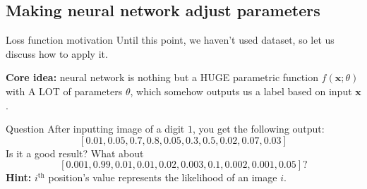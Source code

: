 \documentclass{beamer}
\begin{document}
    \subsection{Making neural network adjust parameters}
    \begin{frame}{Loss function motivation}
        Until this point, we haven't used dataset, so let us discuss how to apply it.
    
        \textbf{Core idea:} neural network is nothing but a HUGE parametric function $f(\mathbf{x};\theta)$ with A LOT of parameters $\theta$, which somehow outputs us a label based on input $\mathbf{x}$. 

        \begin{exampleblock}{Question}
        After inputting image of a digit $1$, you get the following output:
        \[
        [0.01, 0.05, 0.7, 0.8, 0.05, 0.3, 0.5, 0.02, 0.07, 0.03]
        \]
        Is it a good result? What about
        \[
        [0.001, 0.99, 0.01, 0.01, 0.02, 0.003, 0.1, 0.002, 0.001, 0.05]?
        \]
        \textbf{Hint:} $i^{\text{th}}$ position's value represents the likelihood of an image $i$.
        \end{exampleblock}
    \end{frame}
\end{document}
